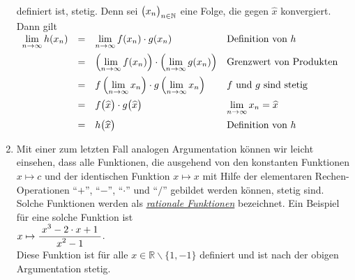 \begin{enumerate}
      definiert ist, stetig.  Denn sei $\bigl(x_n\bigr)_{n\in\mathbb{N}}$ eine Folge, die gegen $\widehat{x}$
      konvergiert.  Dann gilt
      \\[0.2cm]
      \hspace*{1.3cm}      
      $
      \begin{array}[t]{lcll}
            \lim\limits_{n\rightarrow\infty} h(x_n) 
      & = & \lim\limits_{n\rightarrow\infty} f(x_n) \cdot g(x_n) & \mbox{Definition von $h$} \\[0.3cm] 
      & = & \left(\lim\limits_{n\rightarrow\infty} f(x_n)\right) \cdot \left(\lim\limits_{n\rightarrow\infty} g(x_n)\right) &
            \mbox{Grenzwert von Produkten} \\[0.3cm] 
      & = & f\left(\lim\limits_{n\rightarrow\infty} x_n\right) \cdot g\left(\lim\limits_{n\rightarrow\infty} x_n\right) &
            \mbox{$f$ und $g$ sind stetig} \\[0.3cm] 
      & = & f\bigr(\widehat{x}\bigr) \cdot g\bigr(\widehat{x}\bigr) &
            \lim\limits_{n\rightarrow\infty} x_n = \widehat{x} \\[0.3cm] 
      & = & h\bigl(\widehat{x}\bigr) & \mbox{Definition von $h$}
      \end{array}
      $
      
\item Mit einer zum letzten Fall analogen Argumentation k\"onnen wir leicht einsehen, dass alle Funktionen,
      die ausgehend von den konstanten Funktionen $x \mapsto c$ und der identischen
      Funktion $x \mapsto x$ mit Hilfe der elementaren Rechen-Operationen 
      ``$+$'', ``$-$'', ``$\cdot $'' und ``$/$'' gebildet werden k\"onnen, stetig sind.  Solche
      Funktionen werden als \href{http://de.wikipedia.org/wiki/Rationale_Funktion}{\emph{rationale Funktionen}} bezeichnet.
      Ein       Beispiel f\"ur eine solche Funktion ist 
      \\[0.2cm]
      \hspace*{1.3cm}      
      $x \mapsto \displaystyle\frac{\;\displaystyle x^3 - 2\cdot x +1\;}{\;\displaystyle x^2 -1\;}$.
      \\[0.2cm]
      Diese Funktion ist f\"ur alle $x\in\mathbb{R} \backslash \{1,-1\}$ definiert und ist
      nach der obigen Argumentation stetig.



\end{enumerate}
